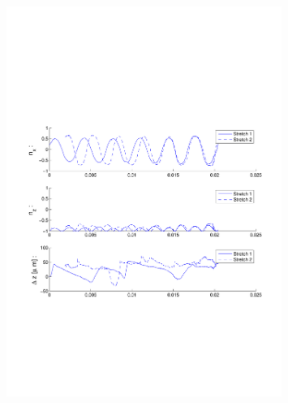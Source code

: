 \begin{figure}[H]

\centering

\includegraphics[width=0.8\textwidth]{Images/Particle 22/Stretch1.pdf}

\end{figure}

